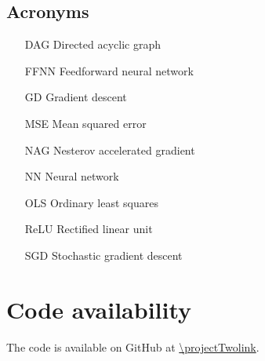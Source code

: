 \subsection*{Acronyms}
\begin{enumerate}[leftmargin=2.9em]
    \item[DAG] Directed acyclic graph
    \item[FFNN] Feedforward neural network
    \item[GD] Gradient descent
    \item[MSE] Mean squared error 
    \item[NAG] Nesterov accelerated gradient
    \item[NN] Neural network 
    \item[OLS] Ordinary least squares 
    \item[ReLU] Rectified linear unit
    \item[SGD] Stochastic gradient descent 
\end{enumerate}








\section*{Code availability}
The code is available on GitHub at \url{\projectTwolink}.







